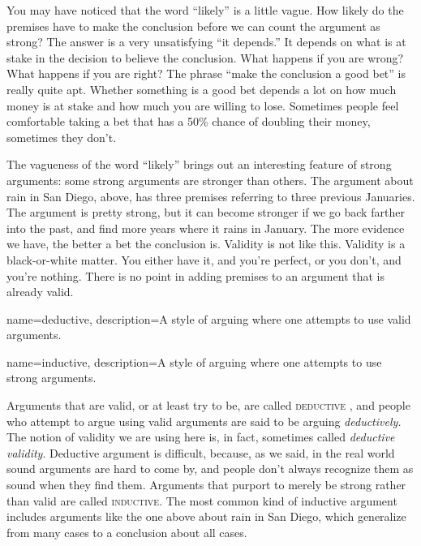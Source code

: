 You may have noticed that the word ``likely'' is a little vague. How likely do the premises have to make the conclusion before we can count the argument as strong? The answer is a very unsatisfying ``it depends.'' It depends on what is at stake in the decision to believe the conclusion. What happens if you are wrong? What happens if you are right? The phrase ``make the conclusion a good bet'' is really quite apt. Whether something is a good bet depends a lot on how much money is at stake and how much you are willing to lose. Sometimes people feel comfortable taking a bet that has a 50\% chance of doubling their money, sometimes they don't.

The vagueness of the word ``likely'' brings out an interesting feature of strong arguments: some strong arguments are stronger than others. The argument about rain in San Diego, above, has three premises referring to three previous Januaries. The argument is pretty strong, but it can become stronger if we go back farther into the past, and find more years where it rains in January. The more evidence we have, the better a bet the conclusion is. Validity is not like this. Validity is a black-or-white matter. You either have it, and you're perfect, or you don't, and you're nothing. There is no point in adding premises to an argument that is already valid.

{
name=deductive,
description={A style of arguing where one attempts to use valid arguments.}
}

{
name=inductive,
description={A style of arguing where one attempts to use strong arguments.}
}

Arguments that are valid, or at least try to be, are called \textsc{\gls{deductive}} \label{def:deductive}, and people who attempt to argue using valid arguments are said to be arguing \textit{deductively.} The notion of validity we are using here is, in fact, sometimes called \textit{deductive validity}. Deductive argument is difficult, because, as we said, in the real world sound arguments are hard to come by, and people don't always recognize them as sound when they find them. Arguments that purport to merely be strong rather than valid are called \textsc{\gls{inductive}}. \label{def:inductive} The most common kind of inductive argument includes arguments like the one above about rain in San Diego, which generalize from many cases to a conclusion about all cases.

